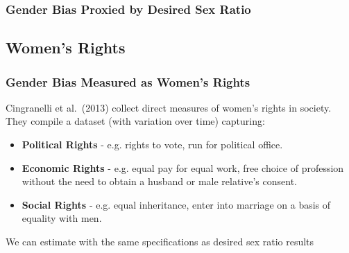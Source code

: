 \documentclass[10pt,letterpaper,subeqn]{beamer}
\begin{document}
\begin{frame}[label=DSRanalysis]
\frametitle{Gender Bias Proxied by Desired Sex Ratio} 

\end{frame}

\subsection{Women's Rights}


\begin{frame}[label=WomensRights]
\frametitle{Gender Bias Measured as Women's Rights}
Cingranelli et al.\ (2013) collect direct measures of women's rights in society.  They compile a dataset (with variation over time) capturing: \vspace{4mm}
\begin{itemize}
		\item \textbf{Political Rights} - e.g. rights to vote, run for political office.
		\item \textbf{Economic Rights} - e.g. equal pay for equal work, free choice of profession without the need to obtain a husband or male relative's consent.
		\item \textbf{Social Rights} - e.g. equal inheritance, enter into marriage on a basis of equality with men.
\end{itemize} \vspace{4mm}
We can estimate with the same specifications as desired sex ratio results
\end{frame}

\end{document}
